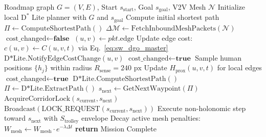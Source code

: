 \documentclass[journal]{IEEEtran}
\begin{document}
\begin{algorithm}[t]
\caption{Socially-Weighted Distributed Graph Optimization (SW-DGO)}
\label{alg:sw_dgo}
\begin{algorithmic}[1]
\Require Roadmap graph $G=(V, E)$, Start $s_{\text{start}}$, Goal $s_{\text{goal}}$, V2V Mesh $\mathcal{N}$
\State Initialize local $\text{D}^*$ Lite planner with $G$ and $s_{\text{goal}}$
\State Compute initial shortest path $\Pi \leftarrow \text{ComputeShortestPath}()$
    \State $\Delta \mathcal{M} \leftarrow \text{FetchInboundMeshPackets}(\mathcal{N})$
    \State $\text{cost\_changed} \leftarrow \textbf{false}$
        \State $(u, v) \leftarrow pkt.\text{edge}$
        \State Update edge cost: $c(u, v) \leftarrow C(u, v, t)$ via Eq.~\eqref{eq:sw_dgo_master}
        \State $\text{D*Lite.NotifyEdgeCostChange}(u, v)$
        \State $\text{cost\_changed} \leftarrow \textbf{true}$
    \EndFor
    \State Sample human positions $\{h_j\}$ within radius $R_{\text{sense}} = 240\text{ px}$
        \State Update $H_{\text{prox}}(u, v, t)$ for local edges
        \State $\text{cost\_changed} \leftarrow \textbf{true}$
    \EndIf
        \State $\text{D*Lite.ComputeShortestPath}()$
        \State $\Pi \leftarrow \text{D*Lite.ExtractPath}()$
    \EndIf
    \State $s_{\text{next}} \leftarrow \text{GetNextWaypoint}(\Pi)$
        \State $\text{AcquireCorridorLock}(s_{\text{current}}, s_{\text{next}})$
        \State $\text{Broadcast}(\text{LOCK\_REQUEST}(s_{\text{current}}, s_{\text{next}}))$
    \EndIf
    \State Execute non-holonomic step toward $s_{\text{next}}$ with $S_{\text{trolley}}$ envelope
    \State Decay active mesh penalties: $W_{\text{mesh}} \leftarrow W_{\text{mesh}} \cdot e^{-\lambda \Delta t}$
\EndWhile
\State \textbf{return} Mission Complete
\end{algorithmic}
\end{algorithm}
\end{document}
